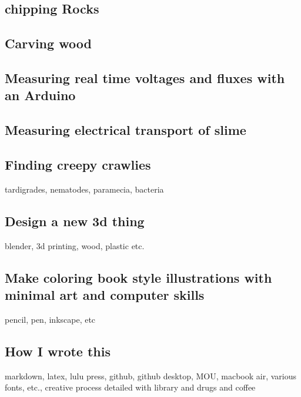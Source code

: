 \subsection{chipping Rocks}\label{chipping-rocks}

\subsection{Carving wood}\label{carving-wood}

\subsection{Measuring real time voltages and fluxes with an
Arduino}\label{measuring-real-time-voltages-and-fluxes-with-an-arduino}

\subsection{Measuring electrical transport of
slime}\label{measuring-electrical-transport-of-slime}

\subsection{Finding creepy crawlies}\label{finding-creepy-crawlies}

tardigrades, nematodes, paramecia, bacteria

\subsection{Design a new 3d thing}\label{design-a-new-3d-thing}

blender, 3d printing, wood, plastic etc.

\subsection{Make coloring book style illustrations with minimal art and
computer
skills}\label{make-coloring-book-style-illustrations-with-minimal-art-and-computer-skills}

pencil, pen, inkscape, etc

\subsection{How I wrote this}\label{how-i-wrote-this}

markdown, latex, lulu press, github, github desktop, MOU, macbook air,
various fonts, etc., creative process detailed with library and drugs
and coffee

